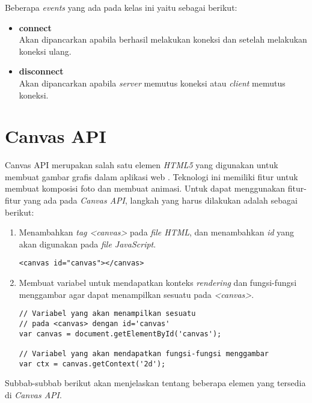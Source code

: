 \begin{enumerate}
	Beberapa \textit{events} yang ada pada kelas ini yaitu sebagai berikut:
	\begin{itemize}
		\item \textbf{connect} \\ Akan dipancarkan apabila berhasil melakukan koneksi dan setelah melakukan koneksi ulang.
		\item \textbf{disconnect} \\ Akan dipancarkan apabila \textit{server} memutus koneksi atau \textit{client} memutus koneksi.
	\end{itemize}
\end{enumerate} 


 

\section{Canvas API}
\label{sec:Canvas API}
 
Canvas API merupakan salah satu elemen \textit{HTML5} yang digunakan untuk membuat gambar grafis dalam aplikasi web \cite{moz:04:canvasapi}. Teknologi ini memiliki fitur untuk membuat komposisi foto dan membuat animasi. Untuk dapat menggunakan fitur-fitur yang ada pada \textit{Canvas API}, langkah yang harus dilakukan adalah sebagai berikut:
\begin{enumerate}
	\item Menambahkan \textit{tag <canvas>} pada \textit{file HTML}, dan menambahkan \textit{id} yang akan digunakan pada \textit{file JavaScript}.
\begin{lstlisting}
<canvas id="canvas"></canvas>
\end{lstlisting}
	
	\item Membuat variabel untuk mendapatkan konteks \textit{rendering} dan fungsi-fungsi menggambar agar dapat menampilkan sesuatu pada \textit{<canvas>}.
\begin{lstlisting}
// Variabel yang akan menampilkan sesuatu 
// pada <canvas> dengan id='canvas'
var canvas = document.getElementById('canvas'); 
	
// Variabel yang akan mendapatkan fungsi-fungsi menggambar 
var ctx = canvas.getContext('2d');
\end{lstlisting}
\end{enumerate}

Subbab-subbab berikut akan menjelaskan tentang beberapa elemen yang tersedia di \textit{Canvas API}.


